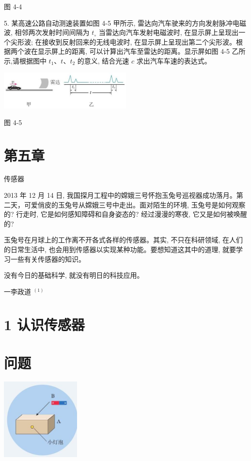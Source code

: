 \documentclass[10pt]{article}
\begin{document}
图 4-4

5. 某高速公路自动测速装置如图 4-5 甲所示, 雷达向汽车驶来的方向发射脉冲电磁波, 相邻两次发射时间间隔为 \({t}_{ \circ }\) 当雷达向汽车发射电磁波时, 在显示屏上呈现出一个尖形波; 在接收到反射回来的无线电波时, 在显示屏上呈现出第二个尖形波。根据两个波在显示屏上的距离, 可以计算出汽车至雷达的距离。显示屏如图 4-5 乙所示,请根据图中 \({t}_{1}\text{、}t\text{、}{t}_{2}\) 的意义, 结合光速 \(c\) 求出汽车车速的表达式。

\begin{center}
\includegraphics[max width=0.5\textwidth]{images/01910e72-c5b7-7ed5-a6d4-fb3a5faefc32_94_170118.jpg}
\end{center}

图 4-5

\section*{第五章}

传感器

2013 年 12 月 14 日, 我国探月工程中的嫦娥三号怀抱玉兔号巡视器成功落月。第二天，可爱俏皮的玉兔号从嫦娥三号中走出。面对陌生的环境, 玉兔号是如何观察的? 行走时, 它是如何感知障碍和自身姿态的? 经过漫漫的寒夜, 它又是如何被唤醒的?

玉兔号在月球上的工作离不开各式各样的传感器。其实, 不只在科研领域, 在人们的日常生活中, 也会用到传感器以实现某种功能。要想知道这其中的道理, 就要学习一些有关传感器的知识。

没有今日的基础科学, 就没有明日的科技应用。

一李政道 \({}^{\left( 1\right) }\)

\section*{1 认识传感器}

\section*{问题}

\begin{center}
\includegraphics[max width=0.3\textwidth]{images/01910e72-c5b7-7ed5-a6d4-fb3a5faefc32_96_909518.jpg}
\end{center}
\end{document}

